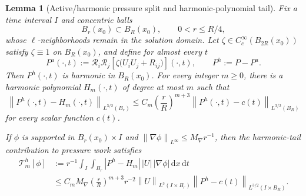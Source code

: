 \documentclass[10pt,a4paper]{amsart}
\numberwithin{equation}{section}
\newtheorem{lemma}[theorem]{Lemma}
\newcommand{\dxdt}{\,\mathrm dx\,\mathrm dt}
\newcommand{\norm}[2]{\left\lVert #1\right\rVert_{#2}}
\begin{document}
\begin{lemma}[Active/harmonic pressure split and harmonic-polynomial tail]\label{lem:harmonic-tail}
Fix a time interval \(I\) and concentric balls
\[
B_r(x_0)\subset B_R(x_0),
\qquad
0<r\le R/4,
\]
whose \(\ell\)-neighborhoods remain in the solution domain. Let \(\zeta\in C_c^\infty(B_{2R}(x_0))\) satisfy \(\zeta\equiv1\) on \(B_R(x_0)\), and define for almost every \(t\)
\begin{equation}\label{eq:active-pressure}
P^a(\cdot,t)
:=
\mathcal R_i\mathcal R_j
\left[
\zeta\bigl(U_iU_j+R_{ij}\bigr)
\right](\cdot,t),
\qquad
P^h:=P-P^a.
\end{equation}
Then \(P^h(\cdot,t)\) is harmonic in \(B_R(x_0)\). For every integer \(m\ge0\), there is a harmonic polynomial \(H_m(\cdot,t)\) of degree at most \(m\) such that
\begin{equation}\label{eq:harmonic-tail}
\norm{P^h(\cdot,t)-H_m(\cdot,t)}{L^{3/2}(B_r)}
\le
C_m
\left(\frac rR\right)^{m+3}
\norm{P^h(\cdot,t)-c(t)}{L^{3/2}(B_R)}
\end{equation}
for every scalar function \(c(t)\).

If \(\phi\) is supported in \(B_r(x_0)\times I\) and \(\norm{\nabla\phi}{L^\infty}\le M_\nabla r^{-1}\), then the harmonic-tail contribution to pressure work satisfies
\begin{align}
\mathcal T_{m}^{h}[\phi]
&:=
 r^{-1}
\int_I\int_{B_r}
|P^h-H_m|\,|U|\,|\nabla\phi|\dxdt
\label{eq:T-h-def}
\\
&\le
C_mM_\nabla
\left(\frac rR\right)^{m+3}
 r^{-2}
\norm{U}{L^3(I\times B_r)}
\norm{P^h-c(t)}{L^{3/2}(I\times B_R)}.
\label{eq:T-h-bound}
\end{align}
\end{lemma}
\end{document}
